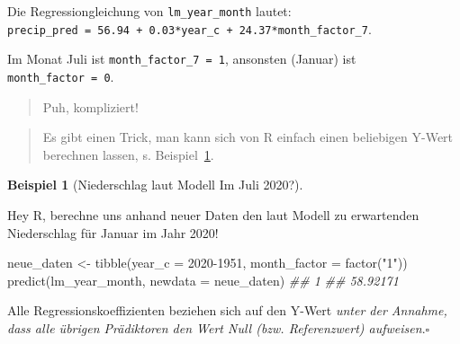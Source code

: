 \documentclass[
  a4paper,
]{scrbook}
\newenvironment{Shaded}{\begin{snugshade}}{\end{snugshade}}
\newcommand{\AttributeTok}[1]{\textcolor[rgb]{0.40,0.45,0.13}{#1}}
\newcommand{\DecValTok}[1]{\textcolor[rgb]{0.68,0.00,0.00}{#1}}
\newcommand{\DocumentationTok}[1]{\textcolor[rgb]{0.37,0.37,0.37}{\textit{#1}}}
\newcommand{\FunctionTok}[1]{\textcolor[rgb]{0.28,0.35,0.67}{#1}}
\newcommand{\NormalTok}[1]{\textcolor[rgb]{0.00,0.23,0.31}{#1}}
\newcommand{\OtherTok}[1]{\textcolor[rgb]{0.00,0.23,0.31}{#1}}
\newcommand{\StringTok}[1]{\textcolor[rgb]{0.13,0.47,0.30}{#1}}
\theoremstyle{definition}
\newtheorem{example}{Beispiel}[chapter]
\theoremstyle{definition}
\theoremstyle{definition}
\theoremstyle{remark}
\begin{document}
Die Regressiongleichung von \texttt{lm\_year\_month} lautet:
\texttt{precip\_pred\ =\ 56.94\ +\ 0.03*year\_c\ +\ 24.37*month\_factor\_7}.

Im Monat Juli ist \texttt{month\_factor\_7\ =\ 1}, ansonsten (Januar)
ist \texttt{month\_factor\ =\ 0}.

\begin{quote}
{} Puh, kompliziert!
\end{quote}

\begin{quote}
{} Es gibt einen Trick, man kann sich von R einfach einen
beliebigen Y-Wert berechnen lassen, s. Beispiel~\ref{exm-niederschlag1}.
\end{quote}

\begin{example}[Niederschlag laut Modell Im Juli
2020?]\protect\hypertarget{exm-niederschlag1}{}\label{exm-niederschlag1}

Hey R, berechne uns anhand neuer Daten den laut Modell zu erwartenden
Niederschlag für Januar im Jahr 2020!

\begin{Shaded}
\begin{Highlighting}[]
\NormalTok{neue\_daten }\OtherTok{\textless{}{-}} \FunctionTok{tibble}\NormalTok{(}\AttributeTok{year\_c =} \DecValTok{2020{-}1951}\NormalTok{,}
                     \AttributeTok{month\_factor =} \FunctionTok{factor}\NormalTok{(}\StringTok{"1"}\NormalTok{))}
\FunctionTok{predict}\NormalTok{(lm\_year\_month, }\AttributeTok{newdata =}\NormalTok{ neue\_daten)}
\DocumentationTok{\#\#        1 }
\DocumentationTok{\#\# 58.92171}
\end{Highlighting}
\end{Shaded}

\end{example}

\begin{tcolorbox}[enhanced jigsaw, colbacktitle=quarto-callout-note-color!10!white, bottomrule=.15mm, left=2mm, breakable, rightrule=.15mm, coltitle=black, title=\textcolor{quarto-callout-note-color}{\faInfo}\hspace{0.5em}{Hinweis}, colback=white, leftrule=.75mm, titlerule=0mm, opacityback=0, bottomtitle=1mm, toprule=.15mm, arc=.35mm, toptitle=1mm, opacitybacktitle=0.6, colframe=quarto-callout-note-color-frame]

Alle Regressionskoeffizienten beziehen sich auf den Y-Wert \emph{unter
der Annahme, dass alle übrigen Prädiktoren den Wert Null (bzw.
Referenzwert) aufweisen}.\(\square\)

\end{tcolorbox}
\end{document}
